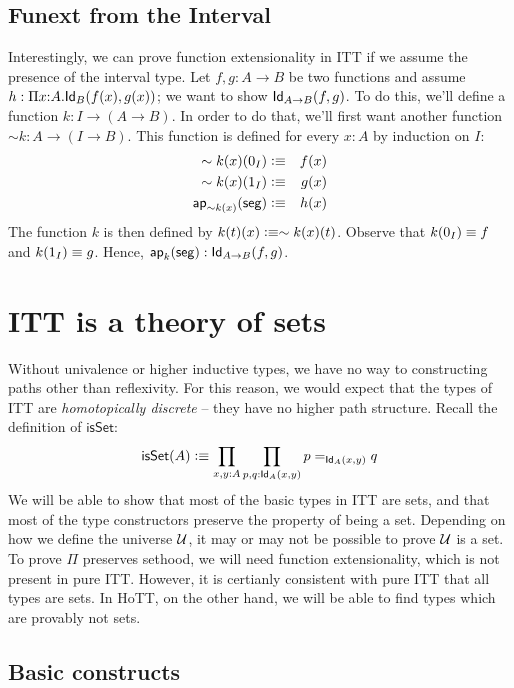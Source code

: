 \documentclass[11pt]{article}
\newcommand*{\Izero}{0_I}
\newcommand*{\Ione}{1_I}
\newcommand*{\Iseg}{\mathsf{seg}}
\newcommand*{\ap}{\mathsf{ap}}
\newcommand*{\isSet}{\mathsf{isSet}}
\begin{document}
\subsection*{{\sc Funext} from the Interval}

Interestingly, we can prove function extensionality in ITT if we assume the
presence of the interval type. Let $f , g : A \to B$ be two functions and
assume $h : \Pi x{:}A. \mathsf{Id}_{B} (f(x), g(x))$; we want to show $\mathsf{Id}_{A\to
B}(f,g)$. To do this, we'll define a function $k : I \to (A \to B)$. In
order to do that, we'll first want another function 
$\sim{k} : A \to (I \to B)$. 
This function is defined for every $x : A$ by induction on $I$:
\begin{eqnarray*} \sim{k}(x)(\Izero) &\defeq& f(x) \\ \sim{k}(x)(\Ione)
&\defeq& g(x) \\ \ap_{\sim{k}(x)}(\Iseg) &\defeq& h(x) \end{eqnarray*} The
function $k$ is then defined by $k(t)(x) \vcentcolon\equiv \sim{k}(x)(t)$. Observe that
$k(\Izero) \jdeq f$ and $k(\Ione) \jdeq g$. Hence, $\ap_k(\Iseg) : \Id{A
\to B}(f,g)$.

\section{ITT is a theory of sets}

Without univalence or higher inductive types, we have no way to constructing paths other than reflexivity. For this reason, we would expect that the types of ITT are \emph{homotopically discrete} -- they have no higher path structure. Recall the definition of $\isSet$:
\[
\isSet(A) \defeq \prod_{x,y:A} \prod_{p,q:\Id{A}(x,y)} p =_{\Id{A}(x,y)} q 
\]
We will be able to show that most of the basic types in ITT are sets, and that most of the type constructors preserve the property of being a set. Depending on how we define the universe $\mathcal{U}$, it may or may not be possible to prove $\mathcal{U}$ is a set. To prove $\Pi$ preserves sethood, we will need function extensionality, which is not present in pure ITT. However, it is certianly consistent with pure ITT that all types are sets. In HoTT, on the other hand, we will be able to find types which are provably not sets.

\subsection*{Basic constructs}
\end{document}
